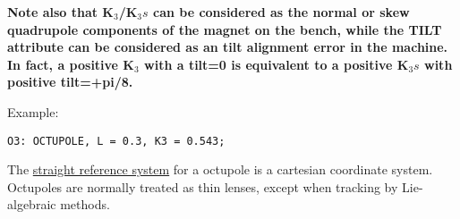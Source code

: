 \textbf{  Note also that K$_3$/K$_3s$ can be considered as the normal or
  skew quadrupole components of the magnet on the bench, while the TILT
  attribute can be considered as an tilt alignment error in the
  machine. In fact, a positive K$_3$ with a tilt=0 is equivalent to a
  positive K$_3s$ with positive tilt=+pi/8. } 

Example: 
\begin{verbatim}
O3: OCTUPOLE, L = 0.3, K3 = 0.543;
\end{verbatim} 

The \href{local_system.html#straight}{straight reference system} for a
octupole is a cartesian coordinate system. Octupoles are normally
treated as thin lenses, except when tracking by Lie-algebraic methods.   

